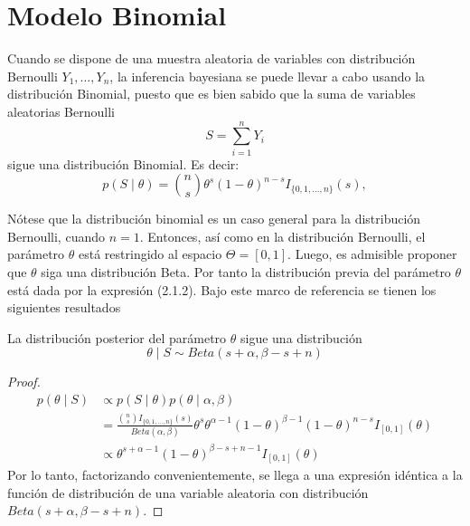     \section{Modelo Binomial}
    
    Cuando se dispone de una muestra aleatoria de variables con distribuci\'on Bernoulli $Y_1,\ldots,Y_n$, la inferencia bayesiana se puede llevar a cabo usando la distribuci\'on Binomial, puesto que es bien sabido que la suma de variables aleatorias Bernoulli
    \begin{equation*}
    S=\sum_{i=1}^nY_i
    \end{equation*}
    sigue una distribuci\'on Binomial. Es decir:
    \begin{equation}
    p(S \mid \theta)=\binom{n}{s}\theta^s(1-\theta)^{n-s}I_{\{0,1,\ldots,n\}}(s),
    \end{equation}
    
    N\'otese que la distribuci\'on binomial es un caso general para la distribuci\'on Bernoulli, cuando $n=1$. Entonces, as\'i como en la distribuci\'on Bernoulli, el par\'ametro $\theta$ est\'a restringido al espacio $\Theta=[0,1]$. Luego, es admisible proponer que $\theta$ siga una distribuci\'on Beta. Por tanto la distribuci\'on previa del par\'ametro $\theta$ est\'a dada por la expresi\'on (2.1.2). Bajo este marco de referencia se tienen los siguientes resultados
    
    \begin{Res}
    La distribuci\'on posterior del par\'ametro $\theta$ sigue una distribuci\'on
    \begin{equation*}
    \theta \mid S \sim Beta(s+\alpha,\beta-s+n)
    \end{equation*}
    \end{Res}
    
    \begin{proof}
    \begin{align*}
    p(\theta \mid S)&\propto p(S \mid \theta)p(\theta \mid \alpha,\beta)\\
    &=\frac{\binom{n}{s}I_{\{0,1,\ldots,n\}}(s)}{Beta(\alpha,\beta)}
    \theta^s\theta^{\alpha-1} (1-\theta)^{\beta-1}(1-\theta)^{n-s}I_{[0,1]}(\theta)\\
    &\propto \theta^{s+\alpha-1} (1-\theta)^{\beta-s+n-1}I_{[0,1]}(\theta)
    \end{align*}
    Por lo tanto, factorizando convenientemente, se llega a una expresi\'on id\'entica a la funci\'on de distribuci\'on de una variable aleatoria con distribuci\'on $Beta(s+\alpha,\beta-s+n)$.
    
    \end{proof}
    

